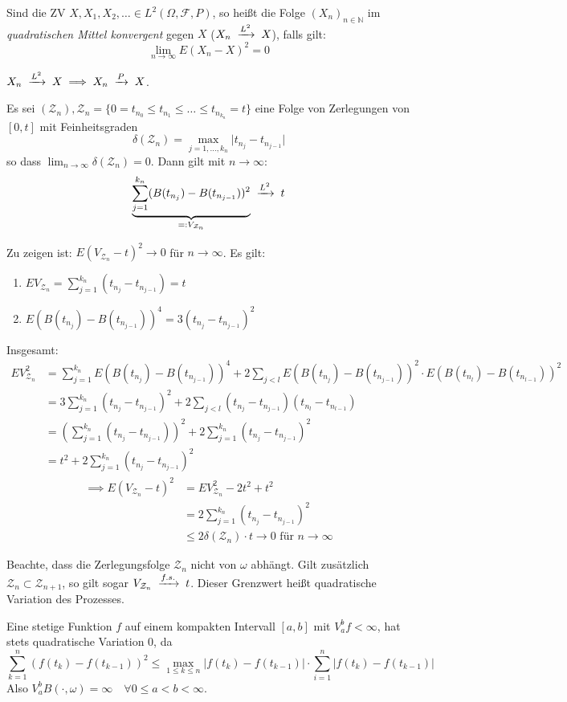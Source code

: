 \documentclass[a4paper,twoside,DIV15,BCOR12mm]{scrbook}
\newcommand{\cF}{\mathcal F}
\begin{document}
\begin{definition}
  Sind die ZV $X,X_1,X_2,\dots\in L^2(\Omega,\cF,P)$, so heißt die Folge $(X_n)_{n\in\mathbb N}$ im \emph{quadratischen Mittel konvergent} gegen $X$ ($X_n\tomit{L^2} X$), falls gilt:
\[
\lim_{n\rightarrow\infty}E(X_n-X)^2=0
\]
\end{definition}
\begin{bemerkung}
  $X_n\tomit{L^2}X\implies X_n\tomit{P}X$.
\end{bemerkung}
\begin{satz}
  \label{Satz 11.3}
  Es sei $(\mathcal Z_n), \mathcal Z_n=\{0=t_{n_0}\leq t_{n_1}\leq\dots\leq t_{n_{k_n}}=t\}$ eine Folge von Zerlegungen von $[0,t]$ mit Feinheitsgraden
\[
\delta(\mathcal Z_n)=\max_{j=1,\dots,k_n}\vert t_{n_j}-t_{n_{j-1}}\vert
\]
so dass $\lim_{n\rightarrow\infty}\delta(\mathcal Z_n)=0$. Dann gilt mit $n\to\infty$:
\[
\underbrace{\sum_{j=1}^{k_n}(B(t_{n_j})-B(t_{n_{j-1}}))^2}_{=:V_{\mathcal Z_n}}\tomit{L^2}t
\] 
\end{satz}
\begin{beweis}
  Zu zeigen ist: $E(V_{\mathcal Z_n}-t)^2\to 0$ für $n\to\infty$. Es gilt:
  \begin{enumerate}
  \item $EV_{\mathcal Z_n}=\sum_{j=1}^{k_n}(t_{n_j}-t_{n_{j-1}})=t$
  \item $E(B(t_{n_j})-B(t_{n_{j-1}}))^4=3(t_{n_j}-t_{n_{j-1}})^2$
  \end{enumerate}
Insgesamt:
\begin{align*}
  EV_{\mathcal Z_n}^2 &= \sum_{j=1}^{k_n}E(B(t_{n_j})-B(t_{n_{j-1}}))^4+2\sum_{j<l}E(B(t_{n_j})-B(t_{n_{j-1}}))^2\cdot E(B(t_{n_l})-B(t_{n_{l-1}}))^2 \\
&=3\sum_{j=1}^{k_n}(t_{n_j}-t_{n_{j-1}})^2+2\sum_{j<l}(t_{n_j}-t_{n_{j-1}})(t_{n_l}-t_{n_{l-1}}) \\
&=\left(\sum_{j=1}^{k_n}(t_{n_j}-t_{n_{j-1}})\right)^2+2\sum_{j=1}^{k_n}(t_{n_j}-t_{n_{j-1}})^2 \\
&=t^2+2\sum_{j=1}^{k_n}(t_{n_j}-t_{n_{j-1}})^2
\end{align*}
\begin{align*}
  \implies E(V_{\mathcal Z_n}-t)^2 &= EV_{\mathcal Z_n}^2-2t^2+t^2 \\
&= 2\sum_{j=1}^{k_n}(t_{n_j}-t_{n_{j-1}})^2 \\
& \leq 2\delta(\mathcal Z_n)\cdot t\to 0 \text{ für } n\to\infty
\end{align*}
\end{beweis}
\begin{bemerkung}
  Beachte, dass die Zerlegungsfolge $\mathcal Z_n$ nicht von $\omega$ abhängt. Gilt zusätzlich $\mathcal Z_n\subset\mathcal Z_{n+1}$, so gilt sogar $V_{\mathcal Z_n}\tomit{f.s.}t$. Dieser Grenzwert heißt quadratische Variation des Prozesses.
\end{bemerkung}
\begin{bemerkung}
  Eine stetige Funktion $f$ auf einem kompakten Intervall $[a,b]$ mit $V_a^bf<\infty$, hat stets quadratische Variation $0$, da
  \[
    \sum_{k=1}^n(f(t_k)-f(t_{k-1}))^2 \leq\max_{1\leq k\leq n}\vert f(t_k)-f(t_{k-1})\vert\cdot\sum_{i=1}^n\vert f(t_k)-f(t_{k-1})\vert
  \]
Also $V_a^b B(\cdot,\omega)=\infty\quad\forall 0\leq a<b<\infty$.
\end{bemerkung}
\end{document}
